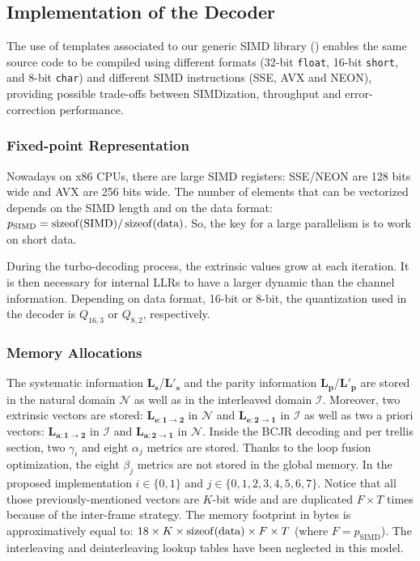 \subsection{Implementation of the Decoder}
\label{sec:opt_turbo_implem}

The use of \Cxx templates associated to our generic SIMD library (\MIPP) enables
the same source code to be compiled using different formats (32-bit
\verb|float|, 16-bit \verb|short|, and 8-bit \verb|char|) and different SIMD
instructions (SSE, AVX and NEON), providing possible trade-offs between
SIMDization, throughput and error-correction performance.

\subsubsection{Fixed-point Representation}

Nowadays on x86 CPUs, there are large SIMD registers: SSE/NEON are 128 bits
wide and AVX are 256 bits wide. The number of elements that can be vectorized
depends on the SIMD length and on the data format:
$p_\text{SIMD} = \operatorname*{sizeof}(\text{SIMD}) / \operatorname*{sizeof}(\text{data})$. So, the key for a
large parallelism is to work on short data.

During the turbo-decoding process, the extrinsic values grow at each iteration.
It is then necessary for internal LLRs to have a larger dynamic than the channel
information. Depending on data format, 16-bit or 8-bit, the quantization used in
the decoder is $Q_{16,3}$ or $Q_{8,2}$, respectively.

\subsubsection{Memory Allocations}

The systematic information $\bm{L_s}$/$\bm{L'_s}$ and the parity information
$\bm{L_p}$/$\bm{L'_p}$ are stored in the natural domain $\mathcal{N}$ as well as
in the interleaved domain $\mathcal{I}$. Moreover, two extrinsic vectors are
stored: $\bm{L_{e:1 \rightarrow 2}}$ in $\mathcal{N}$ and
$\bm{L_{e:2 \rightarrow 1}}$ in $\mathcal{I}$ as well as two a priori vectors:
$\bm{L_{a:1 \rightarrow 2}}$ in $\mathcal{I}$ and
$\bm{L_{a:2 \rightarrow 1}}$ in $\mathcal{N}$. Inside the BCJR decoding and per
trellis section, two $\gamma_{i}$ and eight $\alpha_{j}$ metrics are stored.
Thanks to the loop fusion optimization, the eight $\beta_j$ metrics are not
stored in the global memory. In the proposed implementation $i \in \{0,1\}$ and
$j \in \{0,1,2,3,4,5,6,7\}$. Notice that all those previously-mentioned vectors
are $K$-bit wide and are duplicated $F\times T$ times because of the inter-frame
strategy. The memory footprint in bytes is approximatively equal to:
$18 \times K \times \operatorname*{sizeof}(\text{data}) \times F \times T$ (where
$F = p_\text{SIMD}$). The interleaving and deinterleaving lookup tables have
been neglected in this model.

